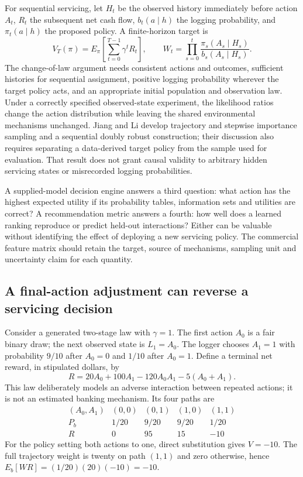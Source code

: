 For sequential servicing, let $H_t$ be the observed history immediately before
action $A_t$, $R_t$ the subsequent net cash flow, $b_t(a\mid h)$ the logging
probability, and $\pi_t(a\mid h)$ the proposed policy. A finite-horizon target is
\[
 V_T(\pi)=E_\pi\left[\sum_{t=0}^{T-1}\gamma^tR_t\right],\qquad
 W_t=\prod_{s=0}^t\frac{\pi_s(A_s\mid H_s)}{b_s(A_s\mid H_s)}.
\]
The change-of-law argument needs consistent actions and outcomes, sufficient
histories for sequential assignment, positive logging probability wherever
the target policy acts, and an appropriate initial population and observation
law. Under a correctly specified observed-state experiment, the likelihood
ratios change the action distribution while leaving the shared environmental
mechanisms unchanged. Jiang and Li develop trajectory and stepwise importance
sampling and a sequential doubly robust construction; their discussion also
requires separating a data-derived target policy from the sample used for
evaluation. That result does not grant causal validity to arbitrary hidden
servicing states or misrecorded logging probabilities. \citep{jiang2016}

A supplied-model decision engine answers a third question: what action has
the highest expected utility if its probability tables, information sets and
utilities are correct? A recommendation metric answers a fourth: how well
does a learned ranking reproduce or predict held-out interactions? Either
can be valuable without identifying the effect of deploying a new servicing
policy. The commercial feature matrix should retain the target, source of
mechanisms, sampling unit and uncertainty claim for each quantity.

\subsection{A final-action adjustment can reverse a servicing decision}

Consider a generated two-stage law with $\gamma=1$. The first action $A_0$ is a fair binary
draw; the next observed state is $L_1=A_0$. The logger chooses $A_1=1$ with
probability $9/10$ after $A_0=0$ and $1/10$ after $A_0=1$. Define a terminal
net reward, in stipulated dollars, by
\[
 R=20A_0+100A_1-120A_0A_1-5(A_0+A_1).
\]
This law deliberately models an adverse interaction between repeated actions;
it is not an estimated banking mechanism. Its four paths are
\[
 \begin{array}{c|rrrr}
 (A_0,A_1)&(0,0)&(0,1)&(1,0)&(1,1)\\\hline
 P_b&1/20&9/20&9/20&1/20\\
 R&0&95&15&-10
 \end{array}
\]
For the policy setting both actions to one, direct substitution gives
$V=-10$. The full trajectory weight is twenty on path $(1,1)$ and zero
otherwise, hence $E_b[WR]=(1/20)(20)(-10)=-10$.
\citep{exec16_cp_exact}


